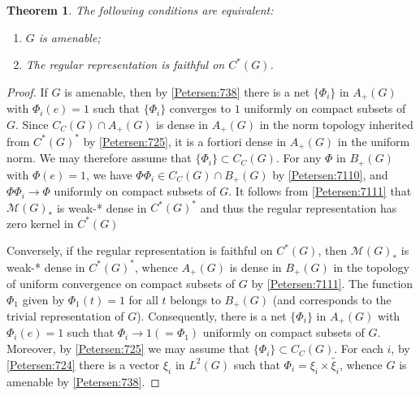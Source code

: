 \documentclass{book}
\newtheorem{theorem}[definition]{Theorem}
\begin{document}
\begin{theorem}\label{Petersen:739}
  The following conditions are equivalent:
  \begin{enumerate}
    \item \(G\) is amenable;
    \item The regular representation is faithful on \(C^*(G)\).
  \end{enumerate}
\end{theorem}
\begin{proof}
  If \(G\) is amenable, then by \ref{Petersen:738} there is a net \(\{\Phi_i\}\)
  in \(A_+(G)\) with \(\Phi_i(e)=1\) such that \(\{\Phi_i\}\) converges to \(1\)
  uniformly on compact subsets of \(G\). Since \(C_C(G)\cap A_+(G)\) is dense in \(A_+(G)\)
  in the norm topology inherited from \(C^*(G)^*\) by \ref{Petersen:725}, it is a fortiori
  dense in \(A_+(G)\) in the uniform norm. We may therefore assume that \(\{\Phi_i\}\subset C_C(G)\).
  For any \(\Phi\) in \(B_+(G)\) with \(\Phi(e)=1\), we have \(\Phi\Phi_i\in C_C(G)\cap B_+(G)\)
  by \ref{Petersen:7110}, and \(\Phi\Phi_i\rightarrow \Phi\) uniformly on compact subsets of \(G\). It follows from \ref{Petersen:7111}
  that \(\mathcal{M}(G)_*\) is weak-* dense in \(C^*(G)^*\) and thus the regular representation has zero kernel in \(C^*(G)\)\par
  Conversely, if the regular representation is faithful on \(C^*(G)\), then \(\mathcal{M}(G)_*\)
  is weak-* dense in \(C^*(G)^*\), whence \(A_+(G)\) is dense in \(B_+(G)\) in the topology
  of uniform convergence on compact subsets of \(G\) by \ref{Petersen:7111}. The function \(\Phi_1\)
  given by \(\Phi_1(t) = 1\) for all \(t\) belongs to \(B_+(G)\) (and corresponds to the trivial
  representation of \(G\)). Consequently, there is a net \(\{\Phi_i\}\) in \(A_+(G)\) with \(\Phi_i(e) = 1\)
  such that \(\Phi_i \rightarrow 1(= \Phi_1)\) uniformly on compact subsets of \(G\). Moreover, by
  \ref{Petersen:725} we may assume that \(\{\Phi_i\}\subset C_C(G)\). For each \(i\), by \ref{Petersen:724} there is a vector
  \(\xi_i\) in \(L^2(G)\) such that \(\Phi_i =\xi_i \times \tilde{\xi_i}\), whence \(G\) is amenable by \ref{Petersen:738}.
\end{proof}
\end{document}
